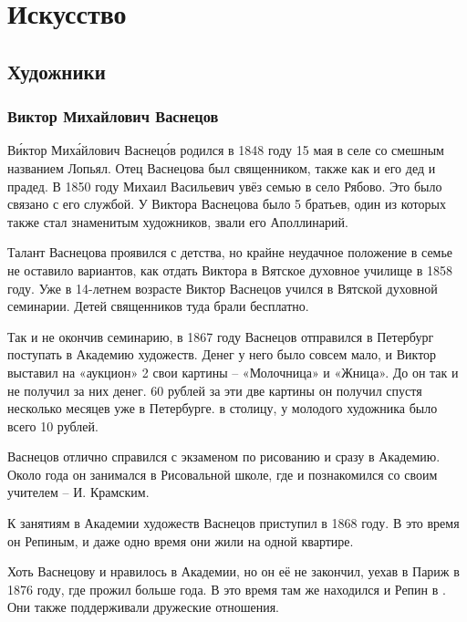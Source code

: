 \chapter{Искусство}

\section{Художники}
\subsection{Виктор Михайлович Васнецов}
В\'{и}ктор Мих\'{а}йлович Васнец\'{о}в родился в 1848 году 15 мая в селе со смешным названием Лопьял. Отец Васнецова был священником, также как и его дед и прадед. В 1850 году Михаил Васильевич увёз семью в село Рябово. Это было связано с его службой. У Виктора Васнецова было 5 братьев, один из которых также стал знаменитым художников, звали его Аполлинарий.

Талант Васнецова проявился с детства, но крайне неудачное  положение в семье не оставило вариантов, как отдать Виктора в Вятское духовное училище в 1858 году. Уже в 14-летнем возрасте Виктор Васнецов учился в Вятской духовной семинарии. Детей священников туда брали бесплатно.

Так и не окончив семинарию, в 1867 году Васнецов отправился в Петербург поступать в Академию художеств. Денег у него было совсем мало, и Виктор выставил на «аукцион» 2 свои картины -- «Молочница» и «Жница». До  он так и не получил за них денег. 60 рублей за эти две картины он получил спустя несколько месяцев уже в Петербурге.  в столицу, у молодого художника было всего 10 рублей.

Васнецов отлично справился с экзаменом по рисованию и сразу  в Академию. Около года он занимался в Рисовальной школе, где и познакомился со своим учителем -- И. Крамским.

К занятиям в Академии художеств Васнецов приступил в 1868 году. В это время он  Репиным, и даже одно время они жили на одной квартире.

Хоть Васнецову и нравилось в Академии, но он её не закончил, уехав в Париж в 1876 году, где прожил больше года. В это время там же находился и Репин в . Они также поддерживали дружеские отношения.

